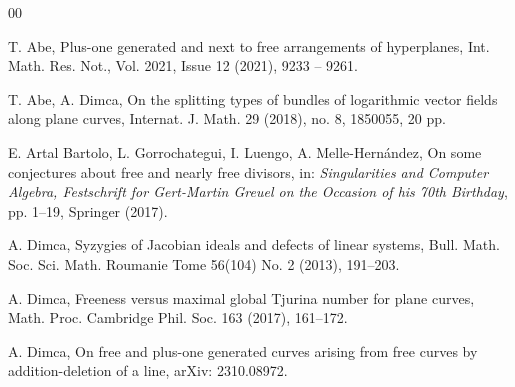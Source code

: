 \documentclass[12pt]{amsart}
\theoremstyle{plain}
\theoremstyle{definition}
\numberwithin{equation}{section}
\begin{document}
\begin{thebibliography}{00}


 T. Abe, Plus-one generated and next to free arrangements of hyperplanes, Int. Math. Res. Not., Vol. 2021, Issue 12 (2021), 9233 -- 9261.


  T. Abe, A. Dimca, On the splitting types of bundles of logarithmic vector fields along plane curves, Internat. J. Math. 29 (2018), no. 8, 1850055, 20 pp.



 E. Artal Bartolo, L. Gorrochategui, I. Luengo, A. Melle-Hern\' andez,
On some conjectures about free and nearly free divisors, in: {\it Singularities and Computer Algebra, Festschrift for Gert-Martin Greuel on the Occasion of his 70th Birthday}, pp. 1--19, Springer (2017).









  A. Dimca, Syzygies of Jacobian ideals and defects of linear systems,
Bull. Math. Soc. Sci. Math. Roumanie Tome 56(104) No. 2 (2013), 191--203.


  A. Dimca, Freeness versus maximal global Tjurina number for plane curves, Math. Proc. Cambridge Phil. Soc.  163 (2017), 161--172.


  A. Dimca, On free and plus-one generated curves arising from free curves by addition-deletion of a line, arXiv: 2310.08972.


\end{thebibliography}
\end{document}
